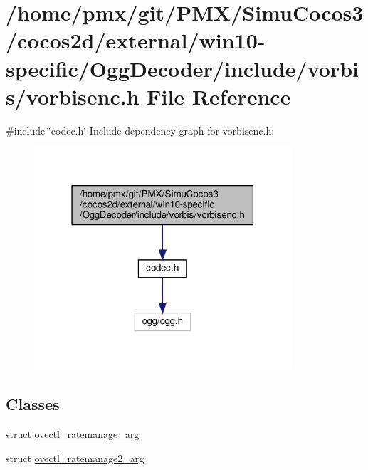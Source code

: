 \hypertarget{_2cocos2d_2external_2win10-specific_2OggDecoder_2include_2vorbis_2vorbisenc_8h}{}\section{/home/pmx/git/\+P\+M\+X/\+Simu\+Cocos3/cocos2d/external/win10-\/specific/\+Ogg\+Decoder/include/vorbis/vorbisenc.h File Reference}
\label{_2cocos2d_2external_2win10-specific_2OggDecoder_2include_2vorbis_2vorbisenc_8h}
{\ttfamily \#include \char`\"{}codec.\+h\char`\"{}}\newline
Include dependency graph for vorbisenc.\+h\+:
\nopagebreak
\begin{figure}[H]
\begin{center}
\leavevmode
\includegraphics[width=271pt]{_2cocos2d_2external_2win10-specific_2OggDecoder_2include_2vorbis_2vorbisenc_8h__incl}
\end{center}
\end{figure}
\subsection*{Classes}
\begin{DoxyCompactItemize}
\item 
struct \hyperlink{structovectl__ratemanage__arg}{ovectl\+\_\+ratemanage\+\_\+arg}
\item 
struct \hyperlink{structovectl__ratemanage2__arg}{ovectl\+\_\+ratemanage2\+\_\+arg}
\end{DoxyCompactItemize}
